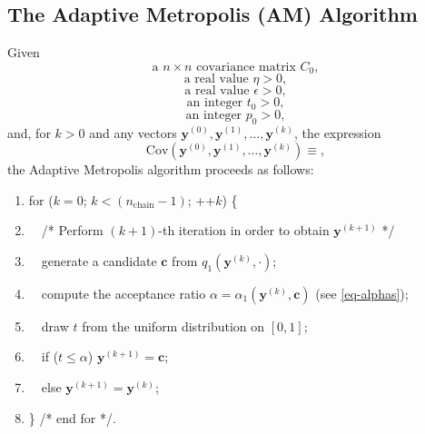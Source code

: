 \subsection{The Adaptive Metropolis (AM) Algorithm}\label{subsc-mcmc-am-alg}
Given
\begin{equation}\label{eq-C0}
\mbox{a }n\times n\mbox{ covariance matrix }C_0,
\end{equation}
\begin{equation}\label{eq-sd}
\mbox{a real value }\eta >0,
\end{equation}
\begin{equation}\label{eq-epsilon}
\mbox{a real value }\epsilon>0,
\end{equation}
\begin{equation}\label{eq-t0}
\mbox{an integer }t_0>0,
\end{equation}
\begin{equation}\label{eq-n0}
\mbox{an integer }p_0>0,
\end{equation}
and, for $k > 0$ and any vectors $\mathbf{y}^{(0)},\mathbf{y}^{(1)},\ldots,\mathbf{y}^{(k)}$, the expression
\begin{equation}\label{eq-emperical-cov}
\mbox{Cov}(\mathbf{y}^{(0)},\mathbf{y}^{(1)},\ldots,\mathbf{y}^{(k)})\equiv,
\end{equation}
the Adaptive Metropolis algorithm proceeds as follows:
\begin{enumerate}
\item for ($k=0$; $k < (n_{\mbox{chain}}-1)$; ++$k$) \{
\item $\quad$/* Perform $(k+1)$-th iteration in order to obtain $\mathbf{y}^{(k+1)}$ */
\item $\quad$generate a candidate $\mathbf{c}$ from $q_1(\mathbf{y}^{(k)},\cdot)$;
\item $\quad$compute the acceptance ratio $\alpha=\alpha_1(\mathbf{y}^{(k)},\mathbf{c})$ (see \eqref{eq-alphas});
\item $\quad$draw $t$ from the uniform distribution on $[0,1]$;
\item $\quad$if ($t\leqslant \alpha$) $\mathbf{y}^{(k+1)}=\mathbf{c}$;
\item $\quad$else $\mathbf{y}^{(k+1)}=\mathbf{y}^{(k)}$;
\item \} /* end for */.
\end{enumerate}

